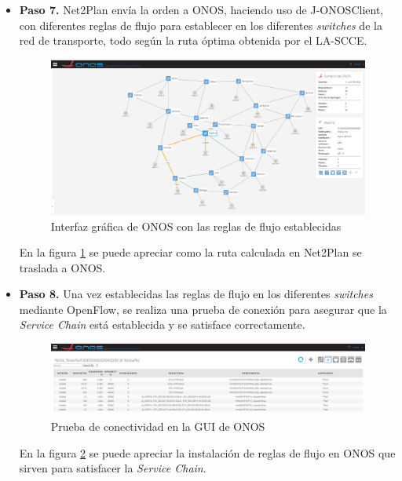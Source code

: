 \begin{itemize}
	\item \textbf{Paso 7.} Net2Plan envía la orden a \ac{ONOS}, haciendo uso de J-ONOSClient, con diferentes reglas de flujo para establecer en los diferentes \textit{switches} de la red de transporte, todo según la ruta óptima obtenida por el \ac{LA-SCCE}.
	
	\begin{figure}[!ht]
		\centering
		\includegraphics[width=0.9\linewidth]{imagenes/topo_onos}
		\caption{Interfaz gráfica de \ac{ONOS} con las reglas de flujo establecidas}
		\label{fig:topo_onos}
	\end{figure}

	En la figura \ref{fig:topo_onos} se puede apreciar como la ruta calculada en Net2Plan se traslada a \ac{ONOS}.

	\item \textbf{Paso 8.} Una vez establecidas las reglas de flujo en los diferentes \textit{switches} mediante OpenFlow, se realiza una prueba de conexión para asegurar que la \textit{Service Chain} está establecida y se satisface correctamente.
	
	\begin{figure}[!ht]
		\centering
		\includegraphics[width=0.9\linewidth]{imagenes/onos_flowrules}
		\caption{Prueba de conectividad en la \ac{GUI} de \ac{ONOS}}
		\label{fig:onosflowrules}
	\end{figure}

	En la figura \ref{fig:onosflowrules} se puede apreciar la instalación de reglas de flujo en \ac{ONOS} que sirven para satisfacer la \textit{Service Chain}.

\end{itemize}

